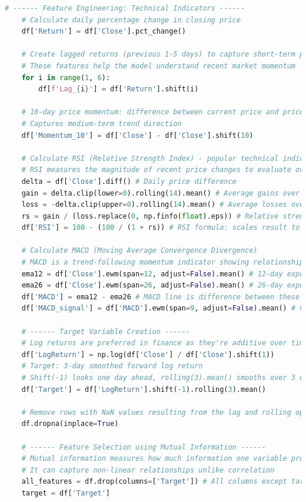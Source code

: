 \documentclass[12pt]{article}
\begin{document}
\begin{lstlisting}[language=Python]
    # ------ Feature Engineering: Technical Indicators ------
    # Calculate daily percentage change in closing price
    df['Return'] = df['Close'].pct_change()
    
    # Create lagged returns (previous 1-5 days) to capture short-term price patterns
    # These features help the model understand recent market momentum
    for i in range(1, 6):
        df[f'Lag_{i}'] = df['Return'].shift(i)
    
    # 10-day price momentum: difference between current price and price 10 days ago
    # Captures medium-term trend direction
    df['Momentum_10'] = df['Close'] - df['Close'].shift(10)

    # Calculate RSI (Relative Strength Index) - popular technical indicator
    # RSI measures the magnitude of recent price changes to evaluate overbought/oversold conditions
    delta = df['Close'].diff() # Daily price difference
    gain = delta.clip(lower=0).rolling(14).mean() # Average gains over 14 days (standard RSI period)
    loss = -delta.clip(upper=0).rolling(14).mean() # Average losses over 14 days
    rs = gain / (loss.replace(0, np.finfo(float).eps)) # Relative strength (gain/loss ratio), avoiding division by zero
    df['RSI'] = 100 - (100 / (1 + rs)) # RSI formula: scales result to 0-100 range

    # Calculate MACD (Moving Average Convergence Divergence)
    # MACD is a trend-following momentum indicator showing relationship between two moving averages
    ema12 = df['Close'].ewm(span=12, adjust=False).mean() # 12-day exponential moving average
    ema26 = df['Close'].ewm(span=26, adjust=False).mean() # 26-day exponential moving average
    df['MACD'] = ema12 - ema26 # MACD line is difference between these EMAs
    df['MACD_signal'] = df['MACD'].ewm(span=9, adjust=False).mean() # 9-day EMA of MACD (signal line)

    # ------ Target Variable Creation ------
    # Log returns are preferred in finance as they're additive over time and more normally distributed
    df['LogReturn'] = np.log(df['Close'] / df['Close'].shift(1))
    # Target: 3-day smoothed forward log return
    # Shift(-1) looks one day ahead, rolling(3).mean() smooths over 3 days to reduce noise
    df['Target'] = df['LogReturn'].shift(-1).rolling(3).mean()

    # Remove rows with NaN values resulting from the lag and rolling operations
    df.dropna(inplace=True)

    # ------ Feature Selection using Mutual Information ------
    # Mutual information measures how much information one variable provides about another
    # It can capture non-linear relationships unlike correlation
    all_features = df.drop(columns=['Target']) # All columns except target
    target = df['Target']


\end{lstlisting}
\end{document}
